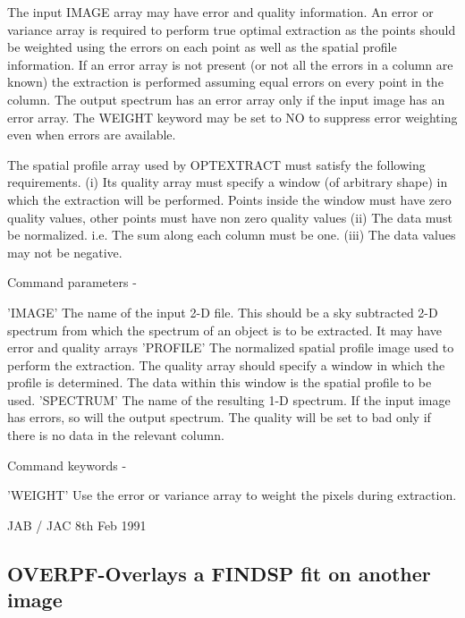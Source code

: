 \begin{description}
\begin{description}
\begin{terminalv}
 The input IMAGE array may have error and quality information. An error
 or variance array is required to perform true optimal extraction as
 the points should be weighted using the errors on each point as well
 as the spatial profile information. If an error array is not present (or
 not all the errors in a column are known) the extraction is performed
 assuming equal errors on every point in the column. The output spectrum
 has an error array only if the input image has an error array. The
 WEIGHT keyword may be set to NO to suppress error weighting even
 when errors are available.

 The spatial profile array used by OPTEXTRACT must satisfy the following
 requirements.
  (i)  Its quality array must specify a window (of arbitrary shape)
       in which the extraction will be performed. Points inside the window
       must have zero quality values, other points must have non zero
       quality values
  (ii) The data must be normalized. i.e. The sum along each column
       must be one.
  (iii) The data values may not be negative.

 Command parameters -

 'IMAGE'    The name of the input 2-D file. This should be a
            sky subtracted 2-D spectrum from which the spectrum
            of an object is to be extracted. It may have error and
            quality arrays
 'PROFILE'  The normalized spatial profile image used to perform the
            extraction. The quality array should specify a window
            in which the profile is determined. The data within
            this window is the spatial profile to be used.
 'SPECTRUM' The name of the resulting 1-D spectrum. If the input image
            has errors, so will the output spectrum. The quality
            will be set to bad only if there is no data in the
            relevant column.

 Command keywords -

 'WEIGHT'    Use the error or variance array to weight the
             pixels during extraction.


                                 JAB / JAC 8th Feb 1991
\end{terminalv}
\end{description}
\subsection{OVERPF-\label{OVERPF}Overlays a FINDSP fit on another image}
\begin{description}


\end{description}
\end{description}
